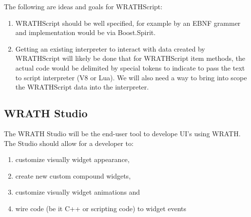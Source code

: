 \documentclass[a4paper,11pt]{article}
\begin{document}
\begin{indenter}{2cm}
\begin{indenter}{1cm}
The following are ideas and goals for WRATHScript:
\begin{enumerate} 
\item WRATHScript should be well specified, for example by an EBNF grammer and implementation would be via Boost.Spirit.
\item Getting an existing interpreter to interact with data created by WRATHScript will likely be done that for WRATHScript item methods, the actual code would be delimited by special tokens to indicate to pass the text to script interpreter (V8 or Lua). We will also need a way to bring into scope the WRATHScript data into the interpreter.
\end{enumerate} 
\end{indenter}

\subsection{WRATH Studio}
\begin{indenter}{1cm}
The WRATH Studio will be the end-user tool to develope UI's using WRATH. The Studio should allow for a developer to:
\begin{enumerate}
\item customize visually widget appearance,
\item create new custom compound widgets, 
\item customize visually widget animations and
\item wire code (be it C++ or scripting code) to widget events
\end{enumerate}
\end{indenter}


\end{indenter}
\end{document}
